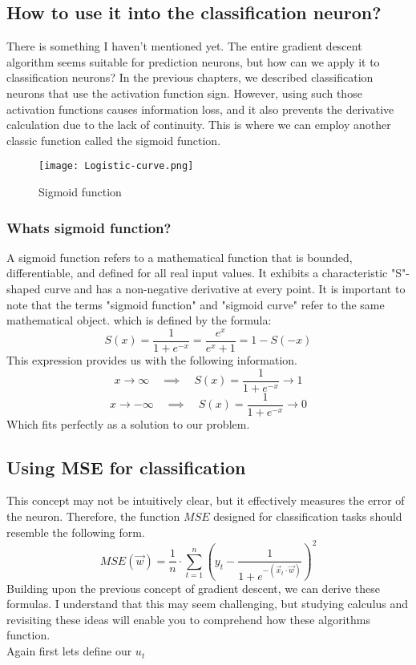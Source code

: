 \subsection{How to use it into the classification neuron?}
There is something I haven't mentioned yet. The entire gradient descent algorithm seems suitable for prediction
neurons, but how can we apply it to classification neurons? In the previous chapters, we described
classification neurons that use the activation function sign. However, using such those activation functions
causes
information loss, and it also prevents the derivative calculation due to the lack of continuity.
This is where we can employ another classic function called the sigmoid function.
\begin{figure}[H]
  \centering
  \texttt{[image: Logistic-curve.png]}
  \caption{Sigmoid function}
\end{figure}

\subsubsection{Whats sigmoid function?}
A sigmoid function refers to a mathematical function that is bounded, differentiable, and defined for all real
input values. It exhibits a characteristic "S"-shaped curve and has a non-negative derivative at every point.
It is important to note that the terms "sigmoid function" and "sigmoid curve" refer to the same mathematical
object. which is defined by the formula:
\[
S(x) = \frac{1}{1 + e^{-x}} = \frac{e^x}{e^x + 1} = 1 - S(-x)
\]
This expression provides us with the following information.
\[
x \rightarrow \infty \quad \implies \quad S(x) = \frac{1}{1 + e^{-x}} \rightarrow 1
\]
\[
x \rightarrow  - \infty \quad \implies \quad S(x) = \frac{1}{1 + e^{-x}} \rightarrow 0
\]
Which fits perfectly as a solution to our problem.
\subsection{Using MSE for classification}
This concept may not be intuitively clear, but it effectively measures the error of the neuron.
Therefore, the function $MSE$ designed for classification tasks should resemble the following form.
\[
MSE(\vec{w}) = \frac{1}{n} \cdot \sum_{t = 1}^{n}(y_t - \frac{1}{1 + e^{-(\vec{x}_t \cdot \vec{w})}})^2
\]
Building upon the previous concept of gradient descent, we can derive these formulas. I understand that
this may seem challenging, but studying calculus and revisiting these ideas will enable you to comprehend
how these algorithms function.\\
Again first lets define our $u_t$

